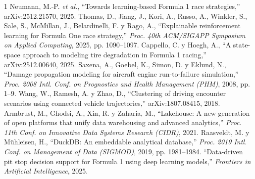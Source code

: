 \documentclass[conference]{IEEEtran}
\begin{document}
\begin{thebibliography}{1}
Neumann, M.-P. \textit{et al.}, ``Towards learning-based Formula 1 race
strategies,'' arXiv:2512.21570, 2025.
Thomas, D., Jiang, J., Kori, A., Russo, A., Winkler, S., Sale, S.,
McMillan, J., Belardinelli, F. y Rago, A., ``Explainable reinforcement
learning for Formula One race strategy,'' \textit{Proc. 40th ACM/SIGAPP
Symposium on Applied Computing}, 2025, pp. 1090–1097.
Cappello, C. y Hoegh, A., ``A state-space approach to modeling tire
degradation in Formula 1 racing,'' arXiv:2512.00640, 2025.
Saxena, A., Goebel, K., Simon, D. y Eklund, N., ``Damage propagation
modeling for aircraft engine run-to-failure simulation,'' \textit{Proc.
2008 Intl. Conf. on Prognostics and Health Management (PHM)}, 2008, pp.
1–9.
Wang, W., Ramesh, A. y Zhao, D., ``Clustering of driving encounter
scenarios using connected vehicle trajectories,'' arXiv:1807.08415, 2018.
Armbrust, M., Ghodsi, A., Xin, R. y Zaharia, M., ``Lakehouse: A new
generation of open platforms that unify data warehousing and advanced
analytics,'' \textit{Proc. 11th Conf. on Innovative Data Systems Research
(CIDR)}, 2021.
Raasveldt, M. y Mühleisen, H., ``DuckDB: An embeddable analytical
database,'' \textit{Proc. 2019 Intl. Conf. on Management of Data (SIGMOD)},
2019, pp. 1981–1984.
``Data-driven pit stop decision support for Formula 1 using deep learning
models,'' \textit{Frontiers in Artificial Intelligence}, 2025.
\end{thebibliography}
\end{document}
